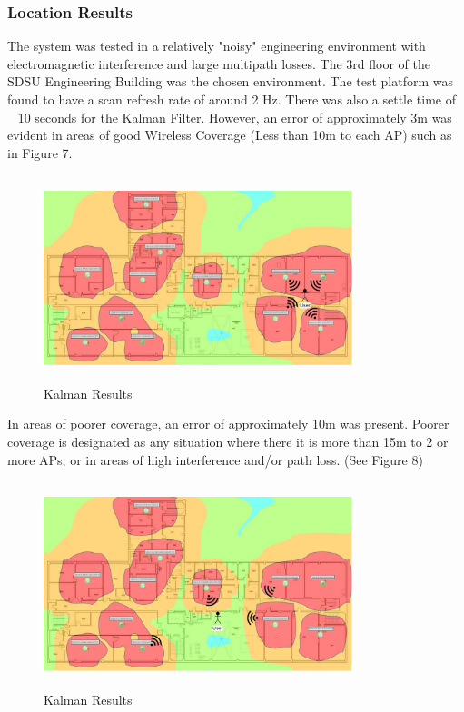 \documentclass[conference]{IEEEtran}
\begin{document}
\subsubsection{Location Results}
The system was tested in a relatively "noisy" engineering environment with electromagnetic interference and large multipath losses. The 3rd floor of the SDSU Engineering Building was the chosen environment. The test platform was found to have a scan refresh rate of around 2 Hz. There was also a settle time of ~ 10 seconds for the Kalman Filter. However, an error of approximately 3m was evident in areas of good Wireless Coverage (Less than 10m to each AP) such as in Figure 7.
\begin{figure}[H]
    \includegraphics[width=9.0cm,height=6cm]{Geolocation_1.jpeg}
    \caption{Kalman Results}
    \end{figure}


In areas of poorer coverage, an error of approximately 10m was present. Poorer coverage is designated as any situation where there it is more than 15m to 2 or more APs, or in areas of high interference and/or path loss. (See Figure 8)
\begin{figure}[H]
    \includegraphics[width=9.0cm,height=6cm]{Geolocation_2.jpeg}
    \caption{Kalman Results}
    \end{figure}
\end{document}
